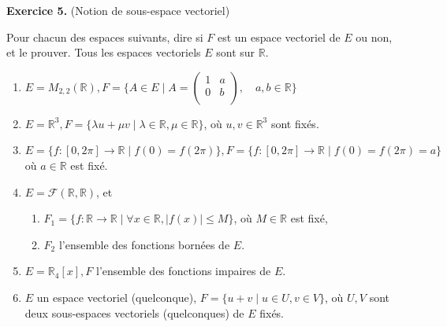 \documentclass[a4paper, 10pt]{report}
\begin{document}
	\newpage
	\vspace{5mm}
	\noindent
	\textbf{Exercice 5.} (Notion de sous-espace vectoriel)
	
	\indent Pour chacun des espaces suivants, dire si $F$ est un espace
	vectoriel de $E$ ou non, et le prouver. Tous les espaces vectoriels
	$E$ sont sur $\mathbb{R}$.
	
	\begin{enumerate}[label=\arabic*.]
		\item $E = M_{2, 2}(\mathbb{R}), F = \bigg\{ A \in E
			\mid A = 
			\begin{pmatrix}
				1& a\\
				0& b\\
			\end{pmatrix}
			, \quad a, b \in \mathbb{R} \bigg\}$
		\item $E = \mathbb{R}^3, F = \{\lambda u + \mu v \mid \lambda \in \mathbb{R}, \mu \in \mathbb{R}\}$, où $u, v \in \mathbb{R}^3$ sont fixés.
		\item $E = \{f : [0, 2\pi] \rightarrow \mathbb{R} \mid f(0) = f(2\pi)\}, F = \{f : [0, 2\pi] \rightarrow \mathbb{R} \mid f(0) = f(2\pi) = a\}$ où $a \in \mathbb{R}$ est fixé.
		\item $E = \mathcal{F}(\mathbb{R}, \mathbb{R})$, et
			\begin{enumerate}[label=(\alph*)]
				\item $F_1 = \{f : \mathbb{R} \rightarrow \mathbb{R}
					\mid \forall x \in \mathbb{R}, |f(x)| \leq M\}$,
					où $M \in \mathbb{R}$ est fixé,
				\item $F_2$ l'ensemble des fonctions bornées de $E$.
			\end{enumerate}
		\item $E = \mathbb{R}_4[x], F$ l'ensemble des fonctions impaires de $E$.
		\item $E$ un espace vectoriel (quelconque), $F = \{u + v 
			\mid u \in U, v \in V\}$, où $U, V$ sont deux
			sous-espaces vectoriels (quelconques) de $E$ fixés.
	\end{enumerate}
	
\end{document}
